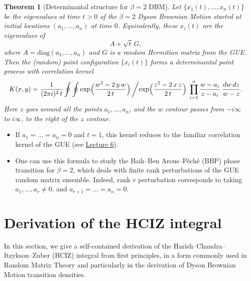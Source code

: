 \documentclass[letterpaper,11pt,oneside,reqno]{article}
\numberwithin{equation}{section}
\newtheorem{theorem}[proposition]{Theorem}
\theoremstyle{definition}
\begin{document}
\begin{theorem}[Determinantal structure for $\beta=2$ DBM]
\label{thm:dbm-det-kernel}
Let $\{x_1(t),\dots,x_n(t)\}$ be the eigenvalues at time $t>0$ of the $\beta=2$ Dyson Brownian Motion started at initial locations $(a_1,\dots,a_n)$ at time $0$.  Equivalently, these $x_i(t)$ are the eigenvalues of
\[
A + \sqrt{t}\,G,
\]
where $A=\mathrm{diag}(a_1,\dots,a_n)$ and $G$ is a random Hermitian matrix from the GUE.  Then the (random) point configuration $\{x_i(t)\}$ forms a determinantal point process with correlation kernel
\[
K(x,y)
=
\frac{1}{(2\pi i)^2\,t}
\oint \oint
\exp\Bigl(\frac{w^2 - 2\,y\,w}{2\,t}\Bigr)\,
\biggl/
\exp\Bigl(\frac{z^2 - 2\,x\,z}{2\,t}\Bigr)
\;\prod_{i=1}^n \frac{w - a_i}{z - a_i}
\;\frac{dw\,dz}{w - z}.
\]
Here $z$ goes around all the points $a_1,\ldots,a_n $, 
and the $w$ contour
passes from $-i\infty$ to $i\infty$, to the right of the $z$ contour.
\end{theorem}

\begin{itemize}
	\item If $a_1=\dots=a_n=0$ and $t=1$, this kernel reduces to the familiar correlation kernel of the GUE (see \href{https://lpetrov.cc/rmt25/rmt25-notes/rmt2025-l06.pdf}{Lecture 6}).
\item 
	One can use this formula to study the Baik--Ben
	Arous--P\'ech\'e (BBP)
	\cite{BBP2005phase}
	phase transition for $\beta=2$, 
	which deals with finite rank perturbations of the GUE random matrix ensemble.
	Indeed, rank $r$ perturbation corresponds to taking $a_1,\ldots,a_r\ne0 $,
	and $a_{r+1}=\dots=a_n=0$.
\end{itemize}




















\section{Derivation of the HCIZ integral}

In this section, we give a self-contained derivation of the Harish--Chandra--Itzykson--Zuber (HCIZ) integral from first principles, in a form commonly used in Random Matrix Theory and particularly in the derivation of Dyson Brownian Motion transition densities.
\end{document}
